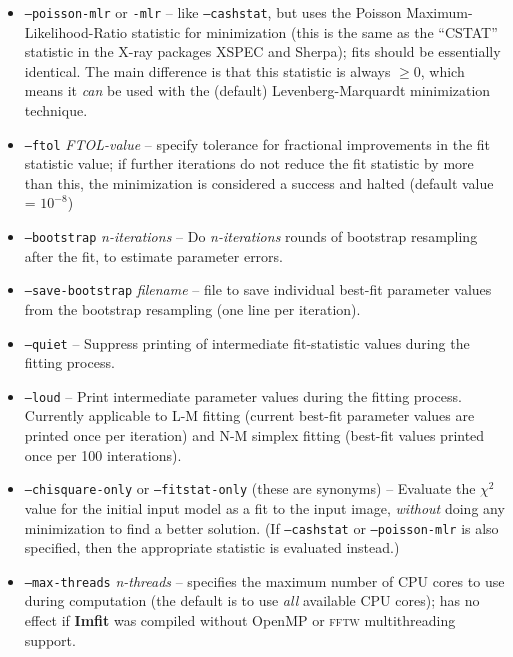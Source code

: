 \documentclass[10pt,a4paper,article]{memoir}
\newcommand{\imfit}{\textbf{Imfit}}
\newcommand{\chisquare}{\ensuremath{\chi^{2}}}
\begin{document}
\begin{itemize}
\item \texttt{--poisson-mlr} or \texttt{-mlr} -- like \texttt{--cashstat}, but uses the
Poisson Maximum-Likelihood-Ratio statistic for minimization (this is
the same as the ``CSTAT'' statistic in the X-ray packages XSPEC and
Sherpa); fits should be essentially identical. The main difference is that this statistic is
always $\ge 0$, which means it \textit{can} be used with the (default)
Levenberg-Marquardt minimization technique.

\item \texttt{--ftol} \textit{FTOL-value} -- specify tolerance for
fractional improvements in the fit statistic value; if further iterations do 
not reduce the fit statistic by more than this, the minimization is considered a 
success and halted (default value = $10^{-8}$)

\bigskip

\item \texttt{--bootstrap} \textit{n-iterations} -- Do \textit{n-iterations} rounds
of bootstrap resampling after the fit, to estimate parameter errors.

\item \texttt{--save-bootstrap} \textit{filename} -- file to save
individual best-fit parameter values from the bootstrap resampling (one
line per iteration).

\bigskip

\item \texttt{--quiet} -- Suppress printing of intermediate fit-statistic values
during the fitting process.

\item \texttt{--loud} -- Print intermediate parameter values during the fitting
process. Currently applicable to L-M fitting (current best-fit parameter values are
printed once per iteration) and N-M simplex fitting (best-fit values printed once per 100 interations).

\bigskip

\item \texttt{--chisquare-only} or \texttt{--fitstat-only} (these are
synonyms) -- Evaluate the \chisquare{} value for the initial input
model as a fit to the input image, \textit{without} doing any
minimization to find a better solution. (If \texttt{--cashstat} or
\texttt{--poisson-mlr} is also specified, then the appropriate 
statistic is evaluated instead.)

\bigskip

\item \texttt{--max-threads} \textit{n-threads} -- specifies the maximum number of CPU cores to use
during computation (the default is to use \textit{all} available CPU cores); has no
effect if \imfit{} was compiled without OpenMP or \textsc{fftw} multithreading support.


\end{itemize}
\end{document}
